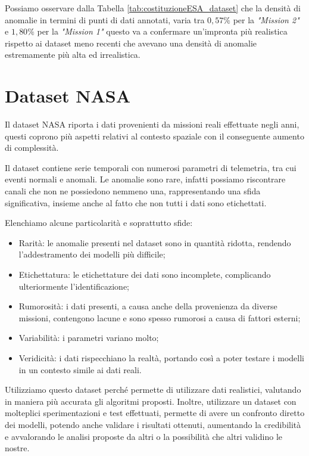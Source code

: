 Possiamo osservare dalla Tabella \ref{tab:costituzioneESA_dataset} che la densità di anomalie in termini di punti di dati annotati, varia tra $0,57\%$ per la \textit{"Mission 2"} e $1,80\%$ per la \textit{"Mission 1"} questo va a confermare un'impronta più realistica rispetto ai dataset meno recenti che avevano una densità di anomalie estremamente più alta ed irrealistica.

\section{Dataset NASA}
Il dataset NASA riporta i dati provenienti da missioni reali effettuate negli anni, questi coprono più aspetti relativi al contesto spaziale con il conseguente aumento di complessità.

Il dataset contiene serie temporali con numerosi parametri di telemetria, tra cui eventi normali e anomali.
Le anomalie sono rare, infatti possiamo riscontrare canali che non ne possiedono nemmeno una, rappresentando una sfida significativa, insieme anche al fatto che non tutti i dati sono etichettati.

Elenchiamo alcune particolarità e soprattutto sfide:
\begin{itemize}
    \item Rarità: le anomalie presenti nel dataset sono in quantità ridotta, rendendo l'addestramento dei modelli più difficile;
    \item Etichettatura: le etichettature dei dati sono incomplete, complicando ulteriormente l'identificazione;
    \item Rumorosità: i dati presenti, a causa anche della provenienza da diverse missioni, contengono lacune e sono spesso rumorosi a causa di fattori esterni;
    \item Variabilità: i parametri variano molto;
    \item Veridicità: i dati rispecchiano la realtà, portando così a poter testare i modelli in un contesto simile ai dati reali.
\end{itemize}

Utilizziamo questo dataset perché permette di utilizzare dati realistici, valutando in maniera più accurata gli algoritmi proposti. Inoltre, utilizzare un dataset con molteplici sperimentazioni e test effettuati, permette di avere un confronto diretto dei modelli, potendo anche validare i risultati ottenuti, aumentando la credibilità e avvalorando le analisi proposte da altri o la possibilità che altri validino le nostre.


